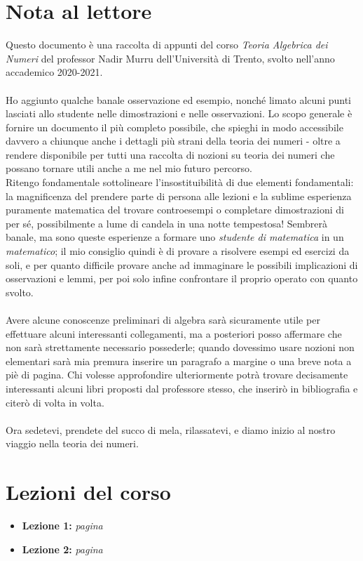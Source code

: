 \documentclass[a4paper,twoside]{book}
\begin{document}
	\section*{Nota al lettore}
	Questo documento è una raccolta di appunti del corso \textit{Teoria Algebrica dei Numeri} del professor Nadir Murru dell'Università di Trento, svolto nell'anno accademico 2020-2021. \\ \\ Ho aggiunto qualche banale osservazione ed esempio, nonché limato alcuni punti lasciati allo studente nelle dimostrazioni e nelle osservazioni. Lo scopo generale è fornire un documento il più completo possibile, che spieghi in modo accessibile davvero a chiunque anche i dettagli più strani della teoria dei numeri - oltre a rendere disponibile per tutti una raccolta di nozioni su teoria dei numeri che possano tornare utili anche a me nel mio futuro percorso. \\ Ritengo fondamentale sottolineare l'insostituibilità di due elementi fondamentali: la magnificenza del prendere parte di persona alle lezioni e la sublime esperienza puramente matematica del trovare controesempi o completare dimostrazioni di per sé, possibilmente a lume di candela in una notte tempestosa! Sembrerà banale, ma sono queste esperienze a formare uno \textit{studente di matematica} in un \textit{matematico}; il mio consiglio quindi è di provare a risolvere esempi ed esercizi da soli, e per quanto difficile provare anche ad immaginare le possibili implicazioni di osservazioni e lemmi, per poi solo infine confrontare il proprio operato con quanto svolto. \\ \\ Avere alcune conoscenze preliminari di algebra sarà sicuramente utile per effettuare alcuni interessanti collegamenti, ma a posteriori posso affermare che non sarà strettamente necessario possederle; quando dovessimo usare nozioni non elementari sarà mia premura inserire un paragrafo a margine o una breve nota a piè di pagina. Chi volesse approfondire ulteriormente potrà trovare decisamente interessanti alcuni libri proposti dal professore stesso, che inserirò in bibliografia e citerò di volta in volta.\\ \\ Ora sedetevi, prendete del succo di mela, rilassatevi, e diamo inizio al nostro viaggio nella teoria dei numeri.
	
	
	
	\newpage
	\section*{Lezioni del corso}
	\renewcommand{\labelitemi}{$\blacksquare$}
	\begin{itemize}
		\item {\large \textbf{Lezione 1:} \textit{pagina \pageref{lezione1}}}
		\item {\large \textbf{Lezione 2:} \textit{pagina \pageref{lezione2}}}
	\end{itemize}
	\renewcommand{\labelitemi}{$\textbullet$}
	
\end{document}
